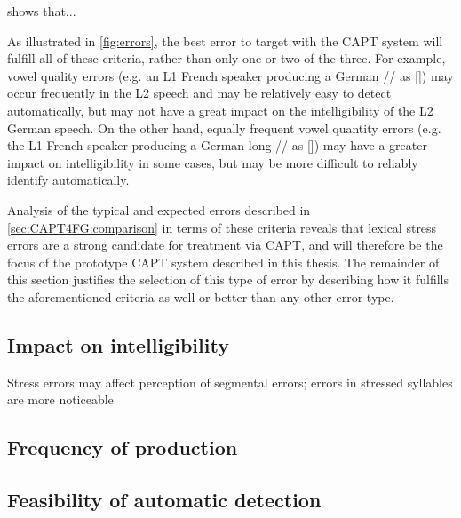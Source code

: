 	 shows that...
	
	 As illustrated in \cref{fig:errors}, the best error to target with the CAPT system will fulfill all of these criteria, rather than only one or two of the three. 
	 For example, vowel quality errors (e.g. an L1 French speaker producing a German // as [\textipa{\oe}]) may occur frequently in the L2 speech and may be relatively easy to detect automatically, but may not have a great impact on the intelligibility of the L2 German speech. On the other hand, equally frequent vowel quantity errors (e.g. the L1 French speaker producing a German long // as []) may have a greater impact on intelligibility in some cases, but may be more difficult to reliably identify automatically.
	
	Analysis of the typical and expected errors described in \cref{sec:CAPT4FG:comparison} in terms of these criteria reveals that lexical stress errors are a strong candidate for treatment via CAPT, and will therefore be the focus of the prototype CAPT system described in this thesis. The remainder of this section justifies the selection of this type of error by describing how it fulfills the aforementioned criteria as well or better than any other error type.
	


		\subsection{Impact on intelligibility}
		\label{sec:targeting:intelligibility}
		\citep{Warren2009}
		
		\citep{Magen1998}
		
		Stress errors may affect perception of segmental errors; errors in stressed syllables are more noticeable \citep{Cutler2005}
				
		
		\subsection{Frequency of production}
		\label{sec:targeting:frequency}
		\citep{Cutler2005}
		
		\citep{Peperkamp2002, Dupoux2001, Dupoux2008}
		
		\subsection{Feasibility of automatic detection}
		\label{sec:targeting:autodetect}
		\citep{ISADEPT, delmonte2011}
		
